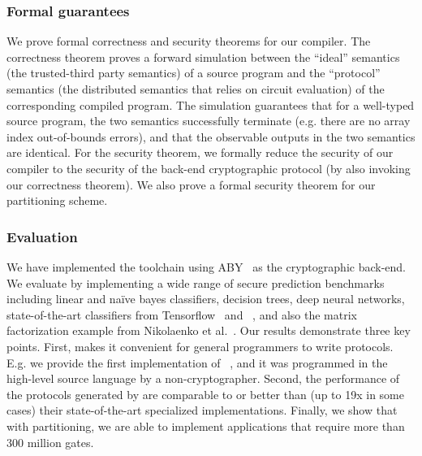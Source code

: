 
\subsubsection*{Formal guarantees} We prove formal correctness and
security theorems for our compiler. The correctness theorem proves a
forward simulation between the
``ideal'' semantics (the trusted-third party semantics) of a source
program and the ``protocol'' semantics (the distributed \mpc
semantics that relies on circuit evaluation) of the corresponding
compiled program. The simulation
guarantees that for a well-typed source program, the two semantics
successfully terminate
(e.g. there are no array index out-of-bounds errors), and that the
observable outputs in the two semantics are
identical. For
the security theorem, we formally reduce the security
of our compiler to the security of the back-end cryptographic
protocol (by also invoking our correctness theorem). We also prove a formal security theorem for our partitioning
scheme.

\subsubsection*{Evaluation} We have implemented the \tool toolchain
using ABY~\cite{aby} as the
cryptographic back-end. We evaluate \tool by implementing a wide range
of secure prediction benchmarks including linear and na\"{i}ve bayes
classifiers, decision trees, deep neural networks, state-of-the-art
classifiers from Tensorflow~\cite{tensorflow}
and \bonsai~\cite{bonsai}, and also the matrix factorization example
from Nikolaenko et al.~\cite{valeriaMatrix}. Our results demonstrate
three key points. First, \tool makes it convenient for general
programmers to write \mpc protocols. E.g. we provide the first \mpc
implementation of \bonsai~\cite{bonsai}, and it was programmed in the
high-level \tool source language by a non-cryptographer. Second, the
performance
of the protocols
generated by \tool are comparable to or better than (up to 19x in some
cases) their state-of-the-art specialized implementations. Finally, we
show that with partitioning, we are able to implement applications
that require more than 300 million gates.

